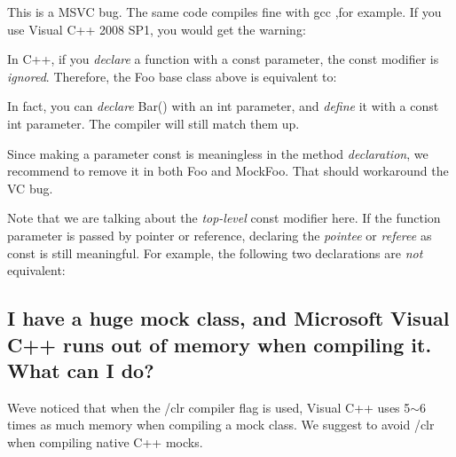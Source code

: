 This is a M\+S\+VC bug. The same code compiles fine with gcc ,for example. If you use Visual C++ 2008 S\+P1, you would get the warning\+: 
\begin{DoxyCode}{0}
\end{DoxyCode}


In C++, if you {\itshape declare} a function with a {\ttfamily const} parameter, the {\ttfamily const} modifier is {\itshape ignored}. Therefore, the {\ttfamily Foo} base class above is equivalent to\+: 
\begin{DoxyCode}{0}
\DoxyCodeLine{\};}
\end{DoxyCode}


In fact, you can {\itshape declare} Bar() with an {\ttfamily int} parameter, and {\itshape define} it with a {\ttfamily const int} parameter. The compiler will still match them up.

Since making a parameter {\ttfamily const} is meaningless in the method {\itshape declaration}, we recommend to remove it in both {\ttfamily Foo} and {\ttfamily Mock\+Foo}. That should workaround the VC bug.

Note that we are talking about the {\itshape top-\/level} {\ttfamily const} modifier here. If the function parameter is passed by pointer or reference, declaring the {\itshape pointee} or {\itshape referee} as {\ttfamily const} is still meaningful. For example, the following two declarations are {\itshape not} equivalent\+: 
\begin{DoxyCode}{0}
\end{DoxyCode}


\subsection*{I have a huge mock class, and Microsoft Visual C++ runs out of memory when compiling it. What can I do?}

We\textquotesingle{}ve noticed that when the {\ttfamily /clr} compiler flag is used, Visual C++ uses 5$\sim$6 times as much memory when compiling a mock class. We suggest to avoid {\ttfamily /clr} when compiling native C++ mocks.

